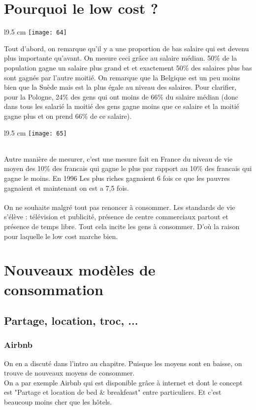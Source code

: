 \section{Pourquoi le low cost ?}
\begin{wrapfigure}[14]{l}{9.5 cm}
	\texttt{[image: 64]}
\end{wrapfigure}
\noindent Tout d'abord, on remarque qu'il y a une proportion de bas salaire qui est devenu plus importante qu’avant. On mesure ceci grâce au salaire médian. 50\% de la population gagne un salaire plus grand et et exactement 50\% des salaires plus bas sont gagnés par l'autre moitié. On remarque que la Belgique est un peu moins bien que la Suède mais est la plus égale au niveau des salaires. Pour clarifier, pour la Pologne, 24\% des gens qui ont moins de 66\% du salaire médian (donc dans tous les salarié la moitié des gens gagne moins que ce salaire et la moitié gagne plus et on prend 66\% de ce salaire).

\begin{wrapfigure}[12]{l}{9.5 cm}
	\texttt{[image: 65]}
\end{wrapfigure}
\ \\
Autre manière de mesurer, c’est une mesure fait en France du niveau de vie moyen des 10\% des francais qui gagne le plus par rapport au 10\% des francais qui gagne le moins. En 1996 Les plus riches gagnaient 6 fois ce que les pauvres gagnaient et maintenant on est a 7,5 fois.\\\\
On ne souhaite malgré tout pas renoncer à consommer. Les standards de vie s’élève : télévision et publicité, présence de centre commerciaux partout et présence de temps libre. Tout cela incite les gens à consommer. D'où la raison pour laquelle le low cost marche bien.

\section{Nouveaux modèles de consommation}
\subsection{Partage, location, troc, ...}
\subsubsection{Airbnb}
On en a discuté dans l'intro au chapitre. Puisque les moyens sont en baisse, on trouve de nouveaux moyens de consommer. \\
On a par exemple Airbnb qui est disponible grâce à internet et dont le concept est "Partage et location de bed \& breakfeast" entre particuliers. Et c’est beaucoup moins cher que les hôtels. 

